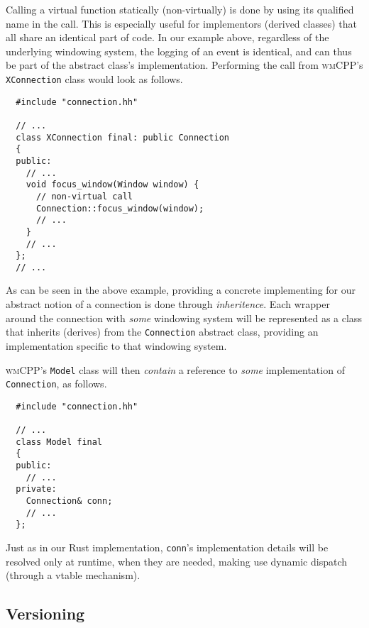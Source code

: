 Calling  a virtual  function statically  (non-virtually)  is done  by using  its
qualified name in the call. This  is especially useful for implementors (derived
classes)  that all  share  an identical  part  of code.  In  our example  above,
regardless  of the  underlying  windowing system,  the logging  of  an event  is
identical,  and  can  thus  be  part of  the  abstract  class's  implementation.
Performing  the call  from \textsc{wmCPP}'s  \texttt{XConnection} class
would look as follows.

\begin{verbatim}
  #include "connection.hh"

  // ...
  class XConnection final: public Connection
  {
  public:
    // ...
    void focus_window(Window window) {
      // non-virtual call
      Connection::focus_window(window);
      // ...
    }
    // ...
  };
  // ...
\end{verbatim}

As  can be  seen in  the above  example, providing  a concrete  implementing for
our  abstract  notion of  a  connection  is done  through  \textit{inheritence}.
Each  wrapper   around  the  connection  with   \textit{some}  windowing  system
will   be  represented   as   a   class  that   inherits   (derives)  from   the
\texttt{Connection}   abstract  class,   providing  an   implementation
specific to that windowing system.

\textsc{wmCPP}'s  \texttt{Model}  class  will then  \textit{contain}  a
reference  to \textit{some}  implementation of  \texttt{Connection}, as
follows.

\begin{verbatim}
  #include "connection.hh"

  // ...
  class Model final
  {
  public:
    // ...
  private:
    Connection& conn;
    // ...
  };
\end{verbatim}

Just  as in  our  Rust  implementation, \texttt{conn}'s  implementation
details  will be  resolved only  at runtime,  when they  are needed,  making use
dynamic dispatch (through a vtable mechanism).

\subsection{Versioning}
{ \textcolor{gray}\blindtext }
